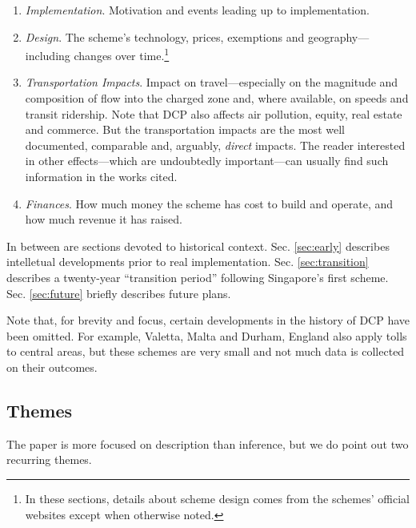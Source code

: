 \begin{enumerate}
    \item \emph{Implementation}. Motivation and events leading up to implementation.
    \item \emph{Design}. The scheme's technology, prices, exemptions and geography---including changes over time.\footnote{In these sections, details about scheme design comes from the schemes' official websites except when otherwise noted.}
    \item \emph{Transportation Impacts}. Impact on travel---especially on the magnitude and composition of flow into the charged zone and, where available, on speeds and transit ridership. Note that DCP also affects air pollution, equity, real estate and commerce. But the transportation impacts are the most well documented, comparable and, arguably, \emph{direct} impacts. The reader interested in other effects---which are undoubtedly important---can usually find such information in the works cited.
    \item \emph{Finances}. How much money the scheme has cost to build and operate, and how much revenue it has raised.
\end{enumerate}

In between are sections devoted to historical context. Sec. \ref{sec:early} describes intelletual developments prior to real implementation. Sec. \ref{sec:transition} describes a twenty-year ``transition period'' following Singapore's first scheme. Sec. \ref{sec:future} briefly describes future plans. 

Note that, for brevity and focus, certain developments in the history of DCP have been omitted. For example, Valetta, Malta \citep{Attard2010} and Durham, England \citep[p.269]{Santos2006a} also apply tolls to central areas, but these schemes are very small and not much data is collected on their outcomes. 


\subsection{Themes}\label{ssec:themes}

The paper is more focused on description than inference, but we do point out two recurring themes.

